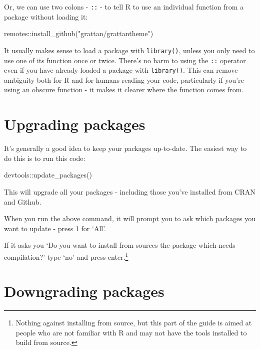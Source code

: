 \documentclass[
]{book}
\newenvironment{Shaded}{\begin{snugshade}}{\end{snugshade}}
\newcommand{\FunctionTok}[1]{\textcolor[rgb]{0.00,0.00,0.00}{#1}}
\newcommand{\NormalTok}[1]{#1}
\newcommand{\SpecialCharTok}[1]{\textcolor[rgb]{0.00,0.00,0.00}{#1}}
\newcommand{\StringTok}[1]{\textcolor[rgb]{0.31,0.60,0.02}{#1}}
\begin{document}
Or, we can use two colons - \texttt{::} - to tell R to use an individual function from a package without loading it:

\begin{Shaded}
\begin{Highlighting}[]
\NormalTok{remotes}\SpecialCharTok{::}\FunctionTok{install\_github}\NormalTok{(}\StringTok{"grattan/grattantheme"}\NormalTok{)}
\end{Highlighting}
\end{Shaded}

It usually makes sense to load a package with \texttt{library()}, unless you only need to use one of its function once or twice. There's no harm to using the \texttt{::} operator even if you have already loaded a package with \texttt{library()}. This can remove ambiguity both for R and for humans reading your code, particularly if you're using an obscure function - it makes it clearer where the function comes from.

\hypertarget{upgrading-packages}{%
\section{Upgrading packages}\label{upgrading-packages}}

It's generally a good idea to keep your packages up-to-date. The easiest way to do this is to run this code:

\begin{Shaded}
\begin{Highlighting}[]
\NormalTok{devtools}\SpecialCharTok{::}\FunctionTok{update\_packages}\NormalTok{()}
\end{Highlighting}
\end{Shaded}

This will upgrade all your packages - including those you've installed from CRAN and Github.

When you run the above command, it will prompt you to ask which packages you want to update - press 1 for `All'.

If it asks you `Do you want to install from sources the package which needs compilation?' type `no' and press enter.\footnote{Nothing against installing from source, but this part of the guide is aimed at people who are not familiar with R and may not have the tools installed to build from source.}

\hypertarget{downgrading-packages}{%
\section{Downgrading packages}\label{downgrading-packages}}
\end{document}
